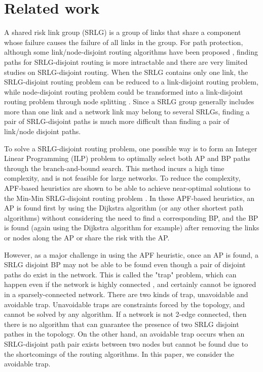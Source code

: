 \section{Related work}
\label{sec:Related}
A shared risk link group (SRLG) is a group of links that share a component whose failure causes the failure of all links in the group. For path protection, although some link/node-disjoint routing algorithms have been proposed \cite{suurballe1984quick,bhandari1997optimal,li1990complexity,guo2003link,xu2004finding,beshir2011variants,guo2013finding,hu2003diverse}, finding paths for SRLG-disjoint routing is more intractable and there are very limited studies on SRLG-disjoint routing. When the SRLG contains only one link, the SRLG-disjoint routing problem can be reduced to a link-disjoint routing problem, while node-disjoint routing problem could be transformed into a link-disjoint routing problem through node splitting \cite{ford2015flows}.
Since a SRLG group generally includes more than one link and a network link may belong to several SRLGs, finding a pair of SRLG-disjoint paths is much more difficult than finding a pair of link/node disjoint paths.


To solve a SRLG-disjoint routing problem, one possible way is to form an Integer Linear Programming (ILP) \cite{hu2003diverse} problem to optimally select both AP and BP paths through the branch-and-bound search. This method incurs a high time complexity, and is not feasible for large networks. To reduce the complexity, APF-based heuristics are shown to be able to achieve near-optimal solutions to the Min-Min SRLG-disjoint routing problem \cite{oki2002disjoint,li2002fiber,eppstein1998finding}. In these APF-based heuristics, an AP is found first by using the Dijkstra algorithm (or any other shortest path algorithms) without considering the need to find a corresponding BP, and the BP is found (again using the Dijkstra algorithm for example) after removing the links or nodes along the AP or share the risk with the AP.

However, as a major challenge in using the APF heuristic, once an AP is found, a SRLG disjoint BP  may not be able to be found even though a pair of disjoint paths do exist in the network. This is called the "trap" problem, which can happen even if the network is highly connected \cite{laborczi2001solving}, and certainly cannot be ignored in a sparsely-connected network. There are two kinds of trap, unavoidable and avoidable trap. Unavoidable traps are constraints forced by the topology, and cannot be solved by any algorithm. If a network is not 2-edge connected, then there is no algorithm that can guarantee the presence of two SRLG disjoint pathes in the topology. On the other hand, an avoidable trap occurs when an SRLG-disjoint path pair exists between two nodes but  cannot be found due to the shortcomings of the routing algorithms. In this paper, we consider the avoidable trap.

